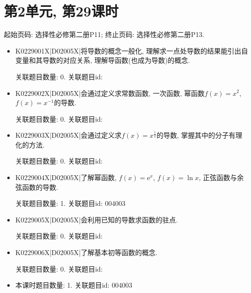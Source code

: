 \section*{第2单元, 第29课时}
起始页码: 选择性必修第二册P11; 终止页码: 选择性必修第二册P13.
\begin{itemize}
\item K0229001X|D02005X|将导数的概念一般化, 理解求一点处导数的结果能引出自变量和其导数的对应关系, 理解导函数(也成为导数)的概念.

关联题目数量: 0. 关联题目id: 

\item K0229002X|D02005X|会通过定义求常数函数, 一次函数, 幂函数$f(x)=x^2$, $f(x)=x^{-1}$的导数.

关联题目数量: 0. 关联题目id: 

\item K0229003X|D02005X|会通过定义求$f(x)=x^\frac 12$的导数, 掌握其中的分子有理化的方法.

关联题目数量: 0. 关联题目id: 

\item K0229004X|D02005X|了解幂函数, $f(x)=\mathrm{e}^x$, $f(x)=\ln x$, 正弦函数与余弦函数的导数.

关联题目数量: 1. 关联题目id: 004003

\item K0229005X|D02005X|会利用已知的导数求函数的驻点.

关联题目数量: 0. 关联题目id: 

\item K0229006X|D02005X|了解基本初等函数的概念.

关联题目数量: 0. 关联题目id: 

\item 本课时题目数量: 1. 关联题目id: 004003

\end{itemize}

